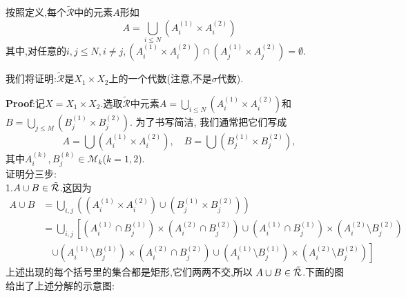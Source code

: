 按照定义,每个$\tilde{\mathcal{R}}$中的元素$A$形如
$$
A=\bigcup_{i\leqslant N}(A_{i}^{(1)}\times A_{i}^{(2)})
$$
其中,对任意的$i,j\leqslant N,i\neq j,(A_{i}^{(1)}\times A_{i}^{(2)})\cap (A_{j}^{(1)}\times A_{j}^{(2)})=\emptyset$.\par
我们将证明:$\tilde{\mathcal{R}}$是$X_1\times X_2$上的一个代数(注意,不是$\sigma$代数).\par
\textbf{Proof}:记$X=X_1\times X_2$.选取$\tilde{\mathcal{R}}$中元素$A=\bigcup_{i\leq N}(A_i^{(1)}\times A_i^{(2)})$和$B=\bigcup_{j\leq M}(B_j^{(1)}\times B_j^{(2)})$. 为了书写简洁, 我们通常把它们写成
$$
A=\bigcup(A_i^{(1)}\times A_i^{(2)}), \quad B=\bigcup(B_j^{(1)}\times B_j^{(2)}),
\label{eq:product_set}
$$
其中$A_i^{(k)},B_j^{(k)}\in\mathcal{M}_k$($k=1,2$).\\
证明分三步:\\
1.$A \cup B \in \tilde{\mathcal{R}}$.这因为
$$
\begin{aligned}
A \cup B &= \bigcup_{i,j} \left( \left(A_i^{(1)} \times A_i^{(2)}\right) \cup \left(B_j^{(1)} \times B_j^{(2)}\right) \right) \\
&= \bigcup_{i,j} \left[ \left(A_i^{(1)} \cap B_j^{(1)}\right) \times \left(A_i^{(2)} \cap B_j^{(2)}\right) \cup \left(A_i^{(1)} \cap B_j^{(1)}\right) \times \left(A_i^{(2)} \setminus B_j^{(2)}\right) \right. \\
&\quad \left. \cup \left(A_i^{(1)} \setminus B_j^{(1)}\right) \times \left(A_i^{(2)} \cap B_j^{(2)}\right) \cup \left(A_i^{(1)} \setminus B_j^{(1)}\right) \times \left(A_i^{(2)} \setminus B_j^{(2)}\right) \right]
\end{aligned}
$$
上述出现的每个括号里的集合都是矩形,它们两两不交,所以 $A \cup B \in \tilde{\mathcal{R}}$.下面的图给出了上述分解的示意图:
